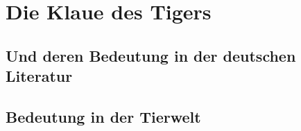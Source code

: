 \section{Die Klaue des Tigers}
\subsection{Und deren Bedeutung in der deutschen Literatur}
\subsection{Bedeutung in der Tierwelt}
\newpage
